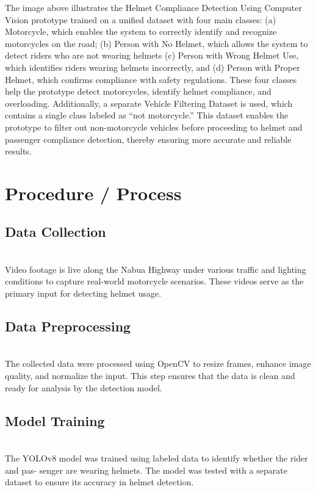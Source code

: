\begin{refsection}
\noindent

The image above illustrates the Helmet Compliance Detection Using Computer Vision prototype trained on a unified dataset with four main classes: (a) Motorcycle, which enables the system to correctly identify and recognize motorcycles on the road; (b) Person with No Helmet, which allows the system to detect riders who are not wearing helmets (c) Person with Wrong Helmet Use, which identifies riders wearing helmets incorrectly, and (d) Person with Proper Helmet, which confirms compliance with safety regulations. These four classes help the prototype detect motorcycles, identify helmet compliance, and overloading.
Additionally, a separate Vehicle Filtering Dataset is used, which contains a single class labeled as “not motorcycle.” This dataset enables the prototype to filter out non-motorcycle vehicles before proceeding to helmet and passenger compliance detection, thereby ensuring more accurate and reliable results.



\section*{Procedure / Process}


\subsection{Data Collection} \\
Video footage is live along the Nabua Highway under various traffic and lighting conditions to capture real-world motorcycle scenarios. These videos serve as the primary input for detecting helmet usage.

\subsection {Data Preprocessing} \\
The collected data were processed using OpenCV to resize frames, enhance image quality, and normalize the input. This step ensures that the data is clean and ready for analysis by the detection model.

\subsection {Model Training} \\
The YOLOv8 model was trained using labeled data to identify whether the rider and pas- senger are wearing helmets. The model was tested with a separate dataset to ensure its accuracy in helmet detection.


\end{refsection}
